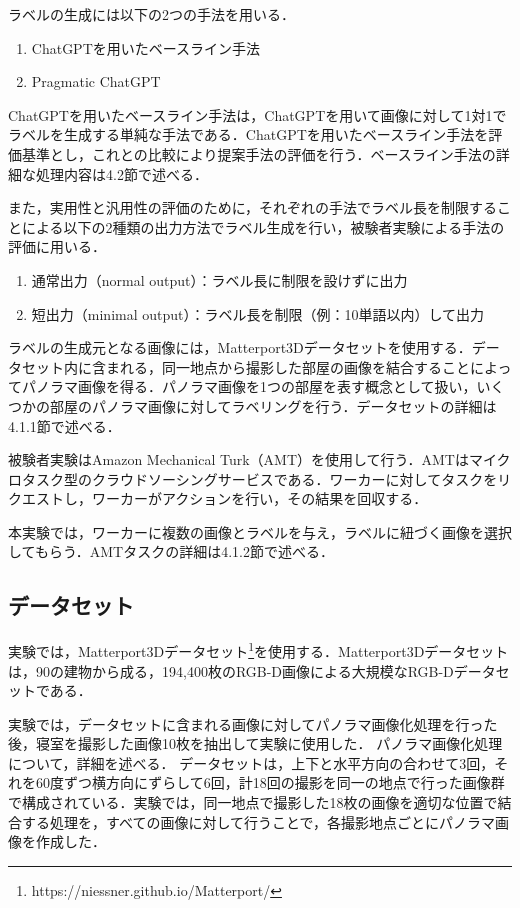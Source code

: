 \documentclass[a4paper,11pt]{jreport}
\begin{document}
ラベルの生成には以下の2つの手法を用いる．
\begin{enumerate}
    \item ChatGPTを用いたベースライン手法
    \item Pragmatic ChatGPT
\end{enumerate}

ChatGPTを用いたベースライン手法は，ChatGPTを用いて画像に対して1対1でラベルを生成する単純な手法である．ChatGPTを用いたベースライン手法を評価基準とし，これとの比較により提案手法の評価を行う．ベースライン手法の詳細な処理内容は4.2節で述べる．

また，実用性と汎用性の評価のために，それぞれの手法でラベル長を制限することによる以下の2種類の出力方法でラベル生成を行い，被験者実験による手法の評価に用いる．

\begin{enumerate}
    \item 通常出力（normal output）：ラベル長に制限を設けずに出力
    \item 短出力（minimal output）：ラベル長を制限（例：10単語以内）して出力
\end{enumerate}

ラベルの生成元となる画像には，Matterport3Dデータセットを使用する．データセット内に含まれる，同一地点から撮影した部屋の画像を結合することによってパノラマ画像を得る．パノラマ画像を1つの部屋を表す概念として扱い，いくつかの部屋のパノラマ画像に対してラベリングを行う．データセットの詳細は4.1.1節で述べる．

被験者実験はAmazon Mechanical Turk（AMT）を使用して行う．AMTはマイクロタスク型のクラウドソーシングサービスである．ワーカーに対してタスクをリクエストし，ワーカーがアクションを行い，その結果を回収する．

本実験では，ワーカーに複数の画像とラベルを与え，ラベルに紐づく画像を選択してもらう．AMTタスクの詳細は4.1.2節で述べる．

\subsection{データセット}

実験では，Matterport3Dデータセット\footnote{https://niessner.github.io/Matterport/}を使用する．Matterport3Dデータセットは，90の建物から成る，194,400枚のRGB-D画像による大規模なRGB-Dデータセットである．

実験では，データセットに含まれる画像に対してパノラマ画像化処理を行った後，寝室を撮影した画像10枚を抽出して実験に使用した．
パノラマ画像化処理について，詳細を述べる．
データセットは，上下と水平方向の合わせて3回，それを60度ずつ横方向にずらして6回，計18回の撮影を同一の地点で行った画像群で構成されている．実験では，同一地点で撮影した18枚の画像を適切な位置で結合する処理を，すべての画像に対して行うことで，各撮影地点ごとにパノラマ画像を作成した．
\end{document}
